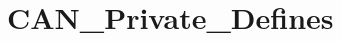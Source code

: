 \hypertarget{group___c_a_n___private___defines}{\section{C\-A\-N\-\_\-\-Private\-\_\-\-Defines}
\label{group___c_a_n___private___defines}
}
